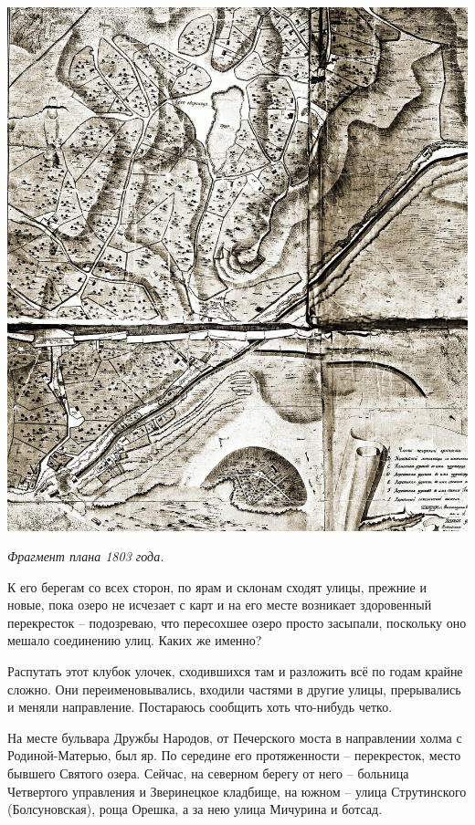 \begin{center}
\includegraphics[width=\linewidth]{chast-vosp/zver/1803-map.jpg}

\textit{Фрагмент плана 1803 года.}
\end{center}

К его берегам со всех сторон, по ярам и склонам сходят улицы, прежние и новые, пока озеро не исчезает с карт и на его месте возникает здоровенный перекресток – подозреваю, что пересохшее озеро просто засыпали, поскольку оно мешало соединению улиц. Каких же именно?

Распутать этот клубок улочек, сходившихся там и разложить всё по годам крайне сложно. Они переименовывались, входили частями в другие улицы, прерывались и меняли направление. Постараюсь сообщить хоть что-нибудь четко.

На месте бульвара Дружбы Народов, от Печерского моста в направлении холма с Родиной-Матерью, был яр. По середине его протяженности – перекресток,  место бывшего Святого озера. Сейчас, на северном берегу от него – больница Четвертого управления и Зверинецкое кладбище, на южном – улица Струтинского (Болсуновская), роща Орешка, а за нею улица Мичурина и ботсад.

